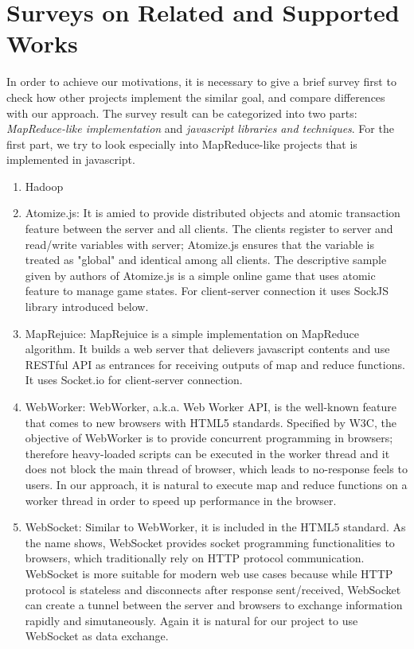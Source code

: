 \section{Surveys on Related and Supported Works}
\label{ch4}

In order to achieve our motivations, it is necessary to give a brief survey first to check how other projects implement the similar goal, and compare differences with our approach.
The survey result can be categorized into two parts: \emph{MapReduce-like implementation} and \emph{javascript libraries and techniques}. For the first part, we try to look especially into MapReduce-like projects that is implemented in javascript.

\begin{enumerate}

\item Hadoop

\item Atomize.js:
  It is amied to provide distributed objects and atomic transaction feature between the server and all clients. The clients register to server and read/write variables with server; Atomize.js ensures that the variable is treated as "global" and identical among all clients. The descriptive sample given by authors of Atomize.js is a simple online game that uses atomic feature to manage game states. For client-server connection it uses SockJS library introduced below.

\item MapRejuice:
  MapRejuice is a simple implementation on MapReduce algorithm. It builds a web server that delievers javascript contents and use RESTful API as entrances for receiving outputs of map and reduce functions.
  It uses Socket.io for client-server connection.

\item WebWorker:
  WebWorker, a.k.a. Web Worker API, is the well-known feature that comes to new browsers with HTML5 standards. Specified by W3C, the objective of WebWorker is to provide concurrent programming in browsers; therefore heavy-loaded scripts can be executed in the worker thread and it does not block the main thread of browser, which leads to no-response feels to users.
  In our approach, it is natural to execute map and reduce functions on a worker thread in order to speed up performance in the browser.

\item WebSocket:
  Similar to WebWorker, it is included in the HTML5 standard. As the name shows, WebSocket provides socket programming functionalities to browsers, which traditionally rely on HTTP protocol communication.
  WebSocket is more suitable for modern web use cases because while HTTP protocol is stateless and disconnects after response sent/received, WebSocket can create a tunnel between the server and browsers to exchange information rapidly and simutaneously.
  Again it is natural for our project to use WebSocket as data exchange.


\end{enumerate}
